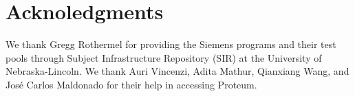 \documentclass{sig-alternate}
\begin{document}
\maketitle


\vspace{-1.5ex}
\vspace{-2ex} \vspace{-2ex}
\vspace{-2ex}







\vspace{-1.5ex}
\section{Acknoledgments}
We thank Gregg Rothermel for providing the Siemens programs and
their test pools through Subject Infrastructure Repository (SIR)
at the University of Nebraska-Lincoln. We thank Auri Vincenzi,
Adita Mathur, Qianxiang Wang, and Jos\'{e} Carlos Maldonado for
their help in accessing Proteum. \vspace{-1.5ex}
%

\vspace{-2ex}
%
%


\end{document}
